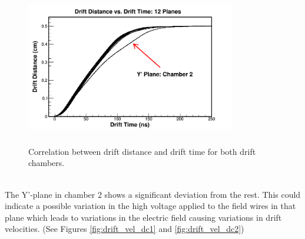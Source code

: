 \documentclass[journal, a4paper]{IEEEtran}
\begin{document}
\begin{figure}[!ht]
  \centering
  \includegraphics[width=3.6in, height=2.7in]{drift_velocity.png}
  \caption{Correlation between drift distance and drift time for both drift chambers.}
  \label{fig:drift_velocity}
\end{figure}\\
\indent The Y'-plane in chamber 2 shows a significant deviation from the rest. This could indicate a possible variation in the
high voltage applied to the field wires in that plane which leads to variations in the electric field causing variations
in drift velocities. (See Figures \ref{fig:drift_vel_dc1} and \ref{fig:drift_vel_dc2})
\end{document}
